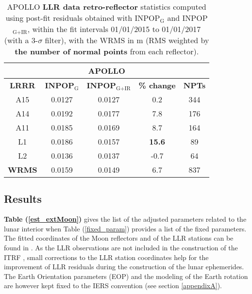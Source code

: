 \documentclass[fleqn,usenatbib,referee]{mnras}
\begin{document}
    \begin{table*}
    \caption{APOLLO \textbf{LLR data retro-reflector} statistics computed using post-fit residuals obtained with INPOP$_{\textrm{G}}$ and INPOP$_{\textrm{G+IR}}$, within the fit intervals 01/01/2015 to 01/01/2017 (with a 3-$\sigma$ filter), with the WRMS in m (RMS weighted by \textbf{the number of normal points} from each reflector). }
    \label{A15_bias_stats_2}
    \begin{tabular}{|c|cccc }
    \hline 
                        \multicolumn{5}{c|}{\textbf{APOLLO} }\\ \hline
    \textbf{LRRR}     &\textbf{INPOP$_{\textrm{G}}$}   &\textbf{INPOP$_{\textrm{G+IR}}$}   & \textbf{\% change}   & \textbf{NPTs} \\ \hline
    A15              &  0.0127                & 0.0127        & 0.2       & 344 \\  
    A14              &  0.0192                & 0.0177        & 7.8       &176 \\
    A11              &  0.0185                & 0.0169        & 8.7       &164 \\ 
    L1               &  0.0186                & 0.0157    &\textbf{15.6}  &89  \\ 
    L2               &  0.0136                & 0.0137        & -0.7      &64  \\ \hline
    \textbf{WRMS}    &  0.0159                & 0.0149  &6.7  & 837 \\ \hline   
    \end{tabular}
    \end{table*}


  \subsection{Results}
  \label{appendix_est}
  \textbf{Table (\ref{est_extMoon})} gives the list of the adjusted parameters related to the lunar interior when Table (\ref{fixed_param}) provides a list of the fixed parameters. The fitted coordinates of the Moon reflectors and of the LLR stations can be found in \cite{Viswanathan2017a}. As the LLR observations are not included in the construction of the ITRF \cite[]{2016JGRE..121.6109L}, small corrections to the LLR station coordinates help for the improvement of LLR residuals during the construction of the lunar ephemerides. The Earth Orientation parameters (EOP) and the modeling of the Earth rotation are however kept fixed to the IERS convention (see section \ref{appendixA}).
\end{document}
